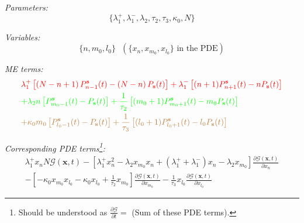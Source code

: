 \documentclass[a4paper, 11pt]{article}
\begin{document}
              {\it Parameters:}
              \begin{equation*}
                \{\lambda_1^+, \lambda_1^-, \lambda_2, \tau_2, \tau_3, \kappa_0, N\}
              \end{equation*}

              {\it Variables:}
              \begin{equation*}
                \{n, m_0, l_0\}\ \ \ \left(\{x_n, x_{m_0}, x_{l_0}\}\text{ in the PDE}\right)
              \end{equation*}

              
              {\it ME terms:}
              \begin{equation}
                \begin{split}
                  &\textcolor{red}{\lambda_1^+\left[\left(N-n+1\right)P_{n-1}^{\mathbf s}(t) - \left(N-n\right)P_{\mathbf s}(t)\right] + \lambda_1^-\left[(n+1)P^{\mathbf s}_{n+1}(t) - nP_{\mathbf s}(t)\right]}\\
                  &\textcolor{green}{+ \lambda_2n\left[P^{\mathbf s}_{m_0-1}(t) - P_{\mathbf s}(t)\right] + \frac{1}{\tau_2}\left[(m_0+1)P^{\mathbf s}_{m_0+1}(t) - m_0P_{\mathbf s}(t)\right]}\\
                  &\textcolor{brown}{+ \kappa_0m_0\left[P^{\mathbf s}_{l_0-1}(t) - P_{\mathbf s}(t)\right] + \frac{1}{\tau_3}\left[(l_0+1)P^{\mathbf s}_{l_0+1}(t) - l_0P_{\mathbf s}(t)\right]}
                \end{split}
              \end{equation}
              
              {\it Corresponding PDE terms\footnote{Should be understood as $\frac{\partial\mathcal G}{\partial t} =$ (Sum of these PDE terms).}:}
              \begin{equation}
                \begin{split}
                  \lambda_1^+x_nN\mathcal G(\mathbf x, t)
                  - \left[\lambda_1^+x_n^2 - \lambda_2x_{m_0}x_n + (\lambda_1^++\lambda_1^-)x_n-\lambda_2x_{m_0}\right]\frac{\partial\mathcal G(\mathbf x, t)}{\partial x_n}\\
                  - \left[-\kappa_0x_{m_0}x_{l_0} - \kappa_0x_{l_0} + \frac{1}{\tau_2}x_{m_0}\right]\frac{\partial\mathcal G(\mathbf x, t)}{\partial x_{m_0}}
                  -\frac{1}{\tau_3}x_{l_0}\frac{\partial\mathcal G(\mathbf x, t)}{\partial x_{l_0}}
                \end{split}
              \end{equation}
\end{document}
